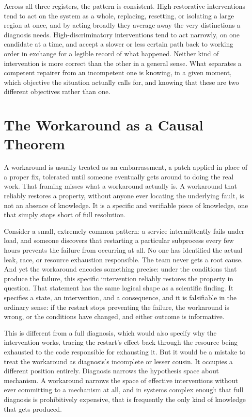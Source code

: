 \documentclass[11pt]{article}
\begin{document}
Across all three registers, the pattern is consistent. High-restorative interventions tend to act on the system as a whole, replacing, resetting, or isolating a large region at once, and by acting broadly they average away the very distinctions a diagnosis needs. High-discriminatory interventions tend to act narrowly, on one candidate at a time, and accept a slower or less certain path back to working order in exchange for a legible record of what happened. Neither kind of intervention is more correct than the other in a general sense. What separates a competent repairer from an incompetent one is knowing, in a given moment, which objective the situation actually calls for, and knowing that these are two different objectives rather than one.

\section{The Workaround as a Causal Theorem}

A workaround is usually treated as an embarrassment, a patch applied in place of a proper fix, tolerated until someone eventually gets around to doing the real work. That framing misses what a workaround actually is. A workaround that reliably restores a property, without anyone ever locating the underlying fault, is not an absence of knowledge. It is a specific and verifiable piece of knowledge, one that simply stops short of full resolution.

Consider a small, extremely common pattern: a service intermittently fails under load, and someone discovers that restarting a particular subprocess every few hours prevents the failure from occurring at all. No one has identified the actual leak, race, or resource exhaustion responsible. The team never gets a root cause. And yet the workaround encodes something precise: under the conditions that produce the failure, this specific intervention reliably restores the property in question. That statement has the same logical shape as a scientific finding. It specifies a state, an intervention, and a consequence, and it is falsifiable in the ordinary sense: if the restart stops preventing the failure, the workaround is wrong, or the conditions have changed, and either outcome is informative.

This is different from a full diagnosis, which would also specify why the intervention works, tracing the restart's effect back through the resource being exhausted to the code responsible for exhausting it. But it would be a mistake to treat the workaround as diagnosis's incomplete or lesser cousin. It occupies a different position entirely. Diagnosis narrows the hypothesis space about mechanism. A workaround narrows the space of effective interventions without ever committing to a mechanism at all, and in systems complex enough that full diagnosis is prohibitively expensive, that is frequently the only kind of knowledge that gets produced.
\end{document}
